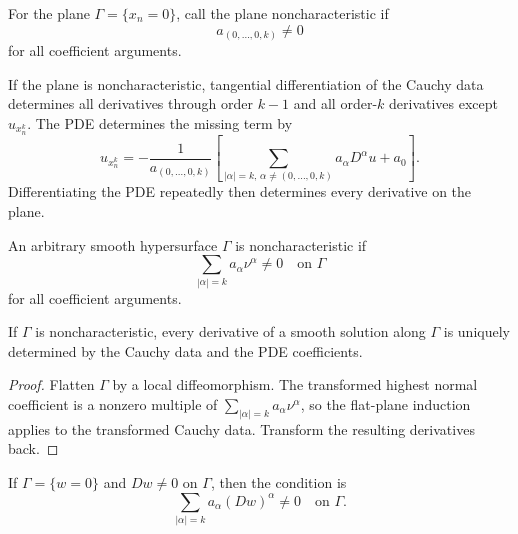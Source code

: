 \begin{definition}
\label{def:noncharacteristic-plane-flat}
For the plane $\Gamma=\{x_n=0\}$, call the plane noncharacteristic if
\[
a_{(0,\ldots,0,k)}\ne0
\]
for all coefficient arguments.
\end{definition}

If the plane is noncharacteristic, tangential differentiation of the Cauchy
data determines all derivatives through order $k-1$ and all order-$k$
derivatives except $u_{x_n^k}$. The PDE determines the missing term by
\[
u_{x_n^k}=-\frac1{a_{(0,\ldots,0,k)}}
\left[\sum_{|\alpha|=k,\,\alpha\ne(0,\ldots,0,k)}a_\alpha D^\alpha u+a_0\right].
\]
Differentiating the PDE repeatedly then determines every derivative on the
plane.

\begin{definition}
\label{def:noncharacteristic-surface}

An arbitrary smooth hypersurface $\Gamma$ is noncharacteristic if
\[
\sum_{|\alpha|=k}a_\alpha\nu^\alpha\ne0\quad\text{on }\Gamma
\]
for all coefficient arguments.
\end{definition}

\begin{theorem}
\label{thm:cauchy-data-noncharacteristic-surfaces}

If $\Gamma$ is noncharacteristic, every derivative of a smooth solution along
$\Gamma$ is uniquely determined by the Cauchy data and the PDE coefficients.
\end{theorem}

\begin{proof}
\sketch Flatten $\Gamma$ by a local diffeomorphism. The transformed highest
normal coefficient is a nonzero multiple of
$\sum_{|\alpha|=k}a_\alpha\nu^\alpha$, so the flat-plane induction applies to
the transformed Cauchy data. Transform the resulting derivatives back.
\end{proof}

\begin{remark}
\label{rem:noncharacteristic-condition-level-set}

If $\Gamma=\{w=0\}$ and $Dw\ne0$ on $\Gamma$, then the condition is
\[
\sum_{|\alpha|=k}a_\alpha(Dw)^\alpha\ne0\quad\text{on }\Gamma.
\]
\end{remark}

